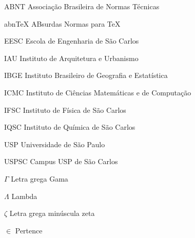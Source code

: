 \documentclass[
12pt,		%
openright,	%
twoside,  %
a4paper,			%
chapter=TITLE,		%
english,			%
french,				%
spanish,			%
brazil				%
]{USPSC}
\begin{document}
\listoffigures*
\cleardoublepage

\listoftables*
\cleardoublepage

\listofquadro*
\cleardoublepage

\begin{siglas}
    \item[ABNT] Associação Brasileira de Normas Técnicas
    \item[abnTeX] ABsurdas Normas para TeX
	\item[EESC] Escola de Engenharia de São Carlos
	\item[IAU] Instituto de Arquitetura e Urbanismo
	\item[IBGE] Instituto Brasileiro de Geografia e Estatística
	\item[ICMC] Instituto de Ciências Matemáticas e de Computação
	\item[IFSC] Instituto de Física de São Carlos
	\item[IQSC] Instituto de Química de São Carlos
	\item[USP] Universidade de São Paulo
	\item[USPSC] Campus USP de São Carlos
	
\end{siglas}

\begin{simbolos}
  \item[$ \Gamma $] Letra grega Gama
  \item[$ \Lambda $] Lambda
  \item[$ \zeta $] Letra grega minúscula zeta
  \item[$ \in $] Pertence
\end{simbolos}
\tableofcontents*
\cleardoublepage
\textual





\end{document}
